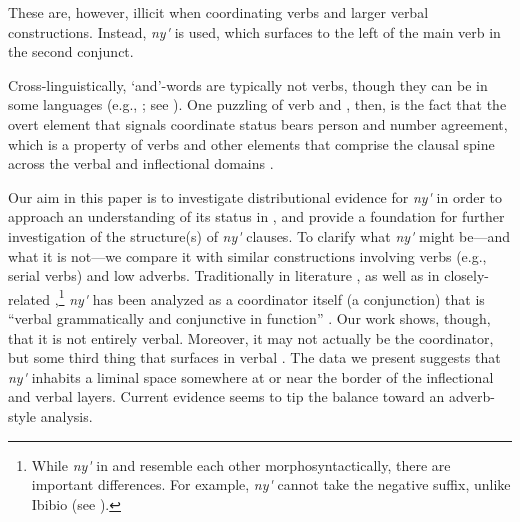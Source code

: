 \documentclass[output=paper
,newtxmath
,modfonts
,nonflat]{langsci/langscibook}
\begin{document}
\noindent These are, however, illicit when coordinating verbs and larger verbal constructions. Instead, \textit{ny\'{\textturnv}\ng} is used, which surfaces to the left of the main verb in the second conjunct.

\ea\label{ex:duncan-et-al:3}
\z
\z

\noindent Cross-linguistically, `and'-words are typically not verbs, though they can be in some languages (e.g., ; see \citealt{brown2008verbs}). One puzzling  of  verb and , then, is the fact that the overt element that signals coordinate status bears person and number agreement, which is a property of verbs and other elements that comprise the clausal spine across the verbal and inflectional domains \citep{baker2010agreement}.

Our aim in this paper is to investigate distributional evidence for \textit{ny\'{\textturnv}\ng} in order to approach an understanding of its status in , and provide a foundation for further investigation of the structure(s) of \textit{ny\'{\textturnv}\ng} clauses. To clarify what \textit{ny\'{\textturnv}\ng} might be---and what it is not---we compare it with similar constructions involving verbs (e.g., serial verbs) and low adverbs. Traditionally in  literature \citep{essien1985negation,essien1990grammar}, as well as in closely-related  \citep{goldie1857principles,welmers1968efik,welmers1973african},\footnote{While \textit{ny\'{\textturnv}\ng} in  and  resemble each other morphosyntactically, there are important differences. For example,  \textit{ny\'{\textturnv}\ng} cannot take the negative suffix, unlike Ibibio (see ).} \textit{ny\'{\textturnv}\ng} has been analyzed as a coordinator itself (a conjunction) that is ``verbal grammatically and conjunctive in function'' \citep[148]{essien1990grammar}. Our work shows, though, that it is not entirely verbal. Moreover, it may not actually be the coordinator, but some third thing that surfaces in verbal . The data we present suggests that \textit{ny\'{\textturnv}\ng} inhabits a liminal space somewhere at or near the border of the inflectional and verbal layers. Current evidence seems to tip the balance toward an adverb-style analysis.
\end{document}
